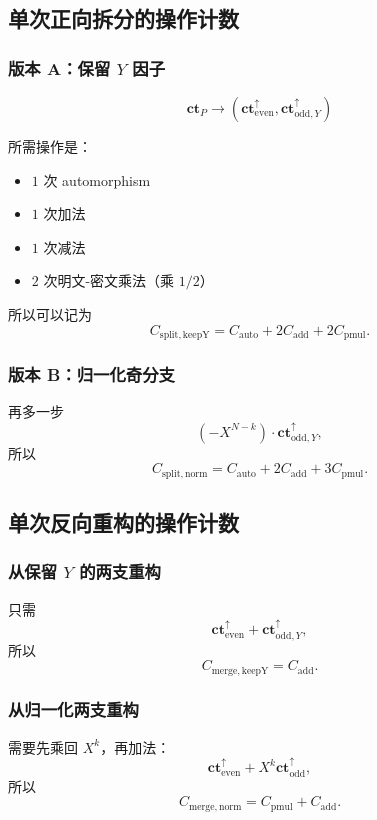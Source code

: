 \documentclass{article}
\newcommand{\ct}{\mathbf{ct}}
\begin{document}
\subsection{单次正向拆分的操作计数}

\subsubsection{版本 A：保留 \(Y\) 因子}

\[
\ct_P \longrightarrow (\ct_{\mathrm{even}}^{\uparrow},\ct_{\mathrm{odd},Y}^{\uparrow})
\]

所需操作是：

\begin{itemize}
    \item \(1\) 次 automorphism
    \item \(1\) 次加法
    \item \(1\) 次减法
    \item \(2\) 次明文-密文乘法（乘 \(1/2\)）
\end{itemize}

所以可以记为
\[
C_{\mathrm{split,keepY}} = C_{\mathrm{auto}} + 2C_{\mathrm{add}} + 2C_{\mathrm{pmul}}.
\]

\subsubsection{版本 B：归一化奇分支}

再多一步
\[
(-X^{N-k})\cdot \ct_{\mathrm{odd},Y}^{\uparrow},
\]
所以
\[
C_{\mathrm{split,norm}} = C_{\mathrm{auto}} + 2C_{\mathrm{add}} + 3C_{\mathrm{pmul}}.
\]

\subsection{单次反向重构的操作计数}

\subsubsection{从保留 \(Y\) 的两支重构}

只需
\[
\ct_{\mathrm{even}}^{\uparrow}+\ct_{\mathrm{odd},Y}^{\uparrow},
\]
所以
\[
C_{\mathrm{merge,keepY}}=C_{\mathrm{add}}.
\]

\subsubsection{从归一化两支重构}

需要先乘回 \(X^k\)，再加法：
\[
\ct_{\mathrm{even}}^{\uparrow}+X^k\ct_{\mathrm{odd}}^{\uparrow},
\]
所以
\[
C_{\mathrm{merge,norm}}=C_{\mathrm{pmul}}+C_{\mathrm{add}}.
\]
\end{document}
